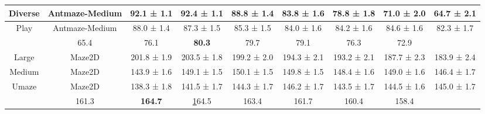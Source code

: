 \begin{table}[t]
{\begin{tabular}{cc|ccccccc}
    \cellcolor[HTML]{FFFFFF}Diverse       & \cellcolor[HTML]{FFFFFF}Antmaze-Medium & \cellcolor[HTML]{FFFFFF}92.1 ± 1.1  & 92.4 ± 1.1     & 88.8 ± 1.4                          & 83.8 ± 1.6  & 78.8 ± 1.8  & 71.0 ± 2.0  & 64.7 ± 2.1  \\ \midrule
    \cellcolor[HTML]{FFFFFF}Play          & \cellcolor[HTML]{FFFFFF}Antmaze-Medium & \cellcolor[HTML]{FFFFFF}88.0 ± 1.4  & 87.3 ± 1.5     & 85.3 ± 1.5                          & 84.0 ± 1.6  & 84.2 ± 1.6  & 84.6 ± 1.6  & 82.3 ± 1.7  \\ \midrule
    \rowcolor[HTML]{E7E6E6} 
    \multicolumn{2}{c}{\cellcolor[HTML]{E7E6E6}\textbf{Performance}}              & 65.4                                & 76.1           & \textbf{80.3}                       & 79.7        & 79.1        & 76.3        & 72.9        \\ \midrule
    \cellcolor[HTML]{FFFFFF}Large         & \cellcolor[HTML]{FFFFFF}Maze2D         & \cellcolor[HTML]{FFFFFF}201.8 ± 1.9 & 203.5 ± 1.8    & 199.2 ± 2.0                         & 194.3 ± 2.1 & 193.2 ± 2.1 & 187.7 ± 2.3 & 183.9 ± 2.4 \\ \midrule
    \cellcolor[HTML]{FFFFFF}Medium        & \cellcolor[HTML]{FFFFFF}Maze2D         & \cellcolor[HTML]{FFFFFF}143.9 ± 1.6 & 149.1 ± 1.5    & 150.1 ± 1.5                         & 149.8 ± 1.5 & 148.4 ± 1.6 & 149.0 ± 1.6 & 146.4 ± 1.7 \\ \midrule
    \cellcolor[HTML]{FFFFFF}Umaze         & \cellcolor[HTML]{FFFFFF}Maze2D         & \cellcolor[HTML]{FFFFFF}138.3 ± 1.8 & 141.5 ± 1.7    & 144.3 ± 1.7                         & 146.2 ± 1.7 & 143.5 ± 1.7 & 144.5 ± 1.6 & 145.0 ± 1.7 \\ \midrule
    \rowcolor[HTML]{E7E6E6} 
    \multicolumn{2}{c}{\cellcolor[HTML]{E7E6E6}\textbf{Performance}}              & 161.3                               & \textbf{164.7} & {\ul 164.5}                         & 163.4       & 161.7       & 160.4       & 158.4       \\ \midrule
\end{tabular}
}
\end{table}
